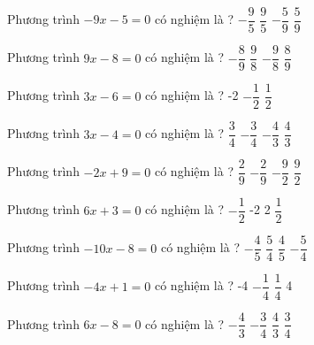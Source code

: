 \begin{ex} 
	Phương trình $-9x-5=0$ có nghiệm là ? 
	\choice
	{$- \dfrac{ 9 }{ 5 } $}
	{$ \dfrac{ 9 }{ 5 } $}
	{\True $- \dfrac{ 5 }{ 9 } $}
	{$ \dfrac{ 5 }{ 9 } $}
	\loigiai{} 
\end{ex}

\begin{ex} 
	Phương trình $9x-8=0$ có nghiệm là ? 
	\choice
	{$- \dfrac{ 8 }{ 9 } $}
	{$ \dfrac{ 9 }{ 8 } $}
	{$- \dfrac{ 9 }{ 8 } $}
	{\True $ \dfrac{ 8 }{ 9 } $}
	\loigiai{} 
\end{ex}

\begin{ex} 
	Phương trình $3x-6=0$ có nghiệm là ? 
	\choice
	{}
	{-2}
	{$- \dfrac{ 1 }{ 2 } $}
	{$ \dfrac{ 1 }{ 2 } $}
	\loigiai{} 
\end{ex}

\begin{ex} 
	Phương trình $3x-4=0$ có nghiệm là ? 
	\choice
	{$ \dfrac{ 3 }{ 4 } $}
	{$- \dfrac{ 3 }{ 4 } $}
	{$- \dfrac{ 4 }{ 3 } $}
	{\True $ \dfrac{ 4 }{ 3 } $}
	\loigiai{} 
\end{ex}

\begin{ex} 
	Phương trình $-2x+9=0$ có nghiệm là ? 
	\choice
	{$ \dfrac{ 2 }{ 9 } $}
	{$- \dfrac{ 2 }{ 9 } $}
	{$- \dfrac{ 9 }{ 2 } $}
	{\True $ \dfrac{ 9 }{ 2 } $}
	\loigiai{} 
\end{ex}

\begin{ex} 
	Phương trình $6x+3=0$ có nghiệm là ? 
	\choice
	{\True $- \dfrac{ 1 }{ 2 } $}
	{-2}
	{2}
	{$ \dfrac{ 1 }{ 2 } $}
	\loigiai{} 
\end{ex}

\begin{ex} 
	Phương trình $-10x-8=0$ có nghiệm là ? 
	\choice
	{\True $- \dfrac{ 4 }{ 5 } $}
	{$ \dfrac{ 5 }{ 4 } $}
	{$ \dfrac{ 4 }{ 5 } $}
	{$- \dfrac{ 5 }{ 4 } $}
	\loigiai{} 
\end{ex}

\begin{ex} 
	Phương trình $-4x+1=0$ có nghiệm là ? 
	\choice
	{-4}
	{$- \dfrac{ 1 }{ 4 } $}
	{\True $ \dfrac{ 1 }{ 4 } $}
	{4}
	\loigiai{} 
\end{ex}

\begin{ex} 
	Phương trình $6x-8=0$ có nghiệm là ? 
	\choice
	{$- \dfrac{ 4 }{ 3 } $}
	{$- \dfrac{ 3 }{ 4 } $}
	{\True $ \dfrac{ 4 }{ 3 } $}
	{$ \dfrac{ 3 }{ 4 } $}
	\loigiai{} 
\end{ex}

